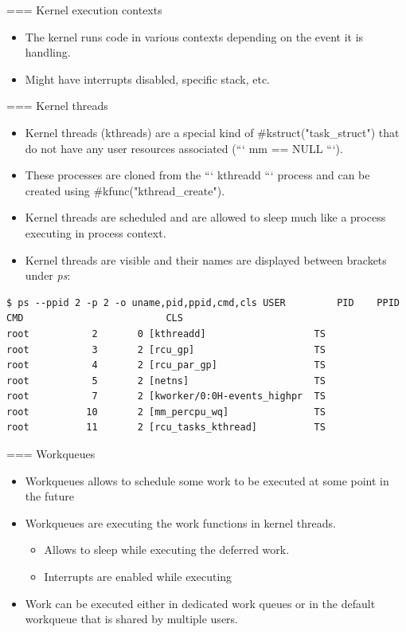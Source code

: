 === Kernel execution contexts
  \begin{itemize}
    \item The kernel runs code in various contexts depending on the event it is
          handling.
    \item Might have interrupts disabled, specific stack, etc.
  \end{itemize}


=== Kernel threads
  \begin{itemize}
    \item Kernel threads (kthreads) are a special kind of #kstruct("task_struct") that do not
          have any user resources associated (``` mm == NULL ```).
    \item These processes are cloned from the ``` kthreadd ``` process and can be
          created using #kfunc("kthread_create").
    \item Kernel threads are scheduled and are allowed to sleep much like a
          process executing in process context.
    \item Kernel threads are visible and their names are displayed between
          brackets under {\em ps}:
  \end{itemize}
  \begin{block}{}
    \begin{verbatim}
$ ps --ppid 2 -p 2 -o uname,pid,ppid,cmd,cls USER         PID    PPID CMD                         CLS
root           2       0 [kthreadd]                   TS
root           3       2 [rcu_gp]                     TS
root           4       2 [rcu_par_gp]                 TS
root           5       2 [netns]                      TS
root           7       2 [kworker/0:0H-events_highpr  TS
root          10       2 [mm_percpu_wq]               TS
root          11       2 [rcu_tasks_kthread]          TS
    \end{verbatim}
  \end{block}


=== Workqueues
  \begin{itemize}
    \item Workqueues allows to schedule some work to be executed at some point
          in the future
    \item Workqueues are executing the work functions in kernel threads.
    \begin{itemize}
      \item Allows to sleep while executing the deferred work.
      \item Interrupts are enabled while executing
    \end{itemize}
    \item Work can be executed either in dedicated work queues or in the
          default workqueue that is shared by multiple users.
  \end{itemize}


